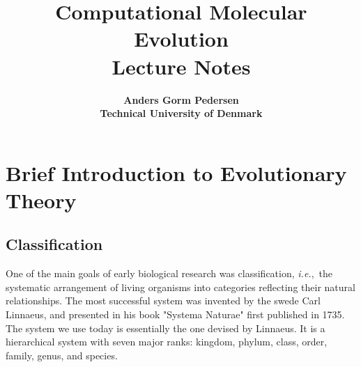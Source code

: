 \documentclass[11pt,a4paper]{book}
\newcommand{\ie}{\emph{i.e.},\ }
\begin{document}
\title{\Huge \bf Computational Molecular Evolution\\{\Large Lecture Notes} }
\author{\Large \bf Anders Gorm Pedersen\\Technical University of Denmark}
\maketitle

\fancyhead{}
\fancyfoot{}
\fancyhead[LE,RO]{\thepage}		
\renewcommand{\headrulewidth}{0.4pt}

\frontmatter
	\tableofcontents 

\mainmatter


\chapter{Brief Introduction to Evolutionary Theory}
		
\section{Classification}

One of the main goals of early biological research was classification, \ie the systematic arrangement of living organisms into categories reflecting their natural relationships. The most successful system was invented by the swede Carl Linnaeus, and presented in his book 
"Systema Naturae" first published in 1735. The system we use today is essentially the one devised by Linnaeus. It is a hierarchical system with seven major ranks: kingdom, phylum, class, order, family, genus, and species. 
\end{document}
